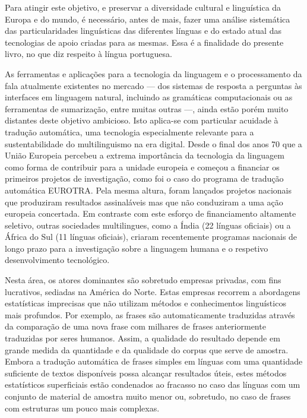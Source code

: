 \begin{multicols}{2}
Para atingir este objetivo, e preservar a diversidade cultural e linguística da Europa e do mundo,  é necessário, antes de mais, 
fazer uma análise sistemática das particularidades linguísticas das diferentes línguas e do estado atual das tecnologias de apoio criadas para as mesmas. 
Essa é a finalidade do presente livro, no que diz respeito à língua portuguesa.

As ferramentas e aplicações para a tecnologia da linguagem e o processamento da fala atualmente existentes no mercado --- dos sistemas de resposta a perguntas às interfaces em linguagem natural, incluindo as gramáticas computacionais ou as ferramentas
de sumarização, entre muitas outras ---, ainda estão porém muito distantes deste objetivo ambicioso. Isto aplica-se com particular acuidade à tradução automática, uma tecnologia especialmente relevante para a sustentabilidade do multilinguismo na era digital.
Desde o final dos anos 70 que a União Europeia percebeu a extrema importância da tecnologia da linguagem como forma de contribuir para a unidade europeia e começou a financiar os primeiros projetos de investigação, como foi o caso do programa de tradução automática EUROTRA. Pela mesma altura, foram lançados projetos nacionais que produziram resultados assinaláveis mas que não conduziram a uma ação europeia concertada. Em contraste com este esforço de financiamento altamente seletivo, outras sociedades multilingues, como a Índia (22 línguas oficiais) ou a África do Sul (11 línguas oficiais), criaram recentemente programas nacionais de longo prazo para a investigação sobre a linguagem humana e o respetivo desenvolvimento tecnológico.

Nesta área, os atores dominantes são sobretudo empresas privadas, com fins lucrativos, sediadas na América do Norte. Estas empresas recorrem a abordagens estatísticas imprecisas que não utilizam métodos e co\-nhe\-ci\-men\-tos linguísticos mais profundos. Por exemplo, as frases são automaticamente traduzidas através da comparação de uma nova frase com milhares de frases anteriormente traduzidas por seres humanos. Assim, a qualidade do resultado depende em grande medida da quantidade e da qualidade do corpus que serve de amostra. Embora a tradução automática de frases simples em línguas com uma quantidade suficiente de textos disponíveis possa alcançar resultados úteis, estes métodos estatísticos superficiais estão condenados ao fracasso no caso das línguas com um conjunto de material de amostra muito menor ou, sobretudo, no caso de frases com estruturas um pouco mais complexas. 


\end{multicols}
